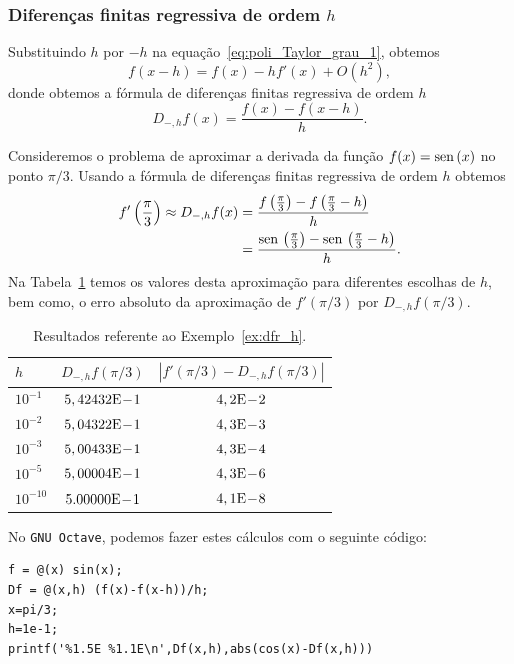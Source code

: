 \subsubsection{Diferenças finitas regressiva de ordem $h$}

Substituindo $h$ por $-h$ na equação~\eqref{eq:poli_Taylor_grau_1}, obtemos
\begin{equation}
  f(x-h) = f(x) - hf'(x) + O(h^2),
\end{equation}
donde obtemos a fórmula de diferenças finitas regressiva de ordem $h$
\begin{equation}\label{eq:dfr_h}
  D_{-,h}f(x) = \frac{f(x) - f(x-h)}{h}.
\end{equation}

\begin{ex}\label{ex:dfr_h}
  Consideremos o problema de aproximar a derivada da função $f(x) = \operatorname{sen}\,(x)$ no ponto $\pi/3$. Usando a fórmula de diferenças finitas regressiva de ordem $h$ obtemos
  \begin{align}
    f'\left(\frac{\pi}{3}\right) \approx D_{-,h}f(x) &= \frac{f\left(\frac{\pi}{3}\right)-f\left(\frac{\pi}{3}-h\right)}{h}\\
          &= \frac{\operatorname{sen}\,\left(\frac{\pi}{3}\right)-\operatorname{sen}\,\left(\frac{\pi}{3}-h\right)}{h}. 
  \end{align}
Na Tabela~\ref{tab:ex_dfr_h} temos os valores desta aproximação para diferentes escolhas de $h$, bem como, o erro absoluto da aproximação de $f'(\pi/3)$ por $D_{-,h}f(\pi/3)$.

\begin{table}[h!]
  \centering
  \caption{Resultados referente ao Exemplo~\ref{ex:dfr_h}.}
  \begin{tabular}{l|c|c}
    $h$ & $D_{-,h}f(\pi/3)$ & $|f'(\pi/3)-D_{-,h}f(\pi/3)|$\\ \hline
    $10^{-1}$ & $5,42432\mathrm{E}\!-\!1$ & $4,2\mathrm{E}\!-\!2$ \\
    $10^{-2}$ & $5,04322\mathrm{E}\!-\!1$ & $4,3\mathrm{E}\!-\!3$ \\
    $10^{-3}$ & $5,00433\mathrm{E}\!-\!1$ & $4,3\mathrm{E}\!-\!4$ \\
    $10^{-5}$ & $5,00004\mathrm{E}\!-\!1$ & $4,3\mathrm{E}\!-\!6$ \\
    $10^{-10}$ & $5.00000\mathrm{E}\!-\!1$ & $4,1\mathrm{E}\!-\!8$ \\\hline
  \end{tabular}
  \label{tab:ex_dfr_h}
\end{table}

No \verb+GNU Octave+, podemos fazer estes cálculos com o seguinte código:
\begin{verbatim}
f = @(x) sin(x);
Df = @(x,h) (f(x)-f(x-h))/h;
x=pi/3;
h=1e-1;
printf('%1.5E %1.1E\n',Df(x,h),abs(cos(x)-Df(x,h)))
\end{verbatim}
\end{ex}


